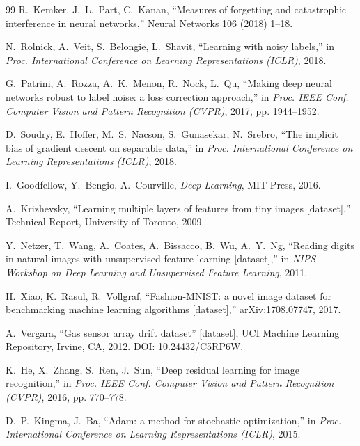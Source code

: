 \documentclass[review,12pt]{elsarticle}
\begin{document}
\begin{thebibliography}{99}
R.~Kemker, J.~L.~Part, C.~Kanan, ``Measures of forgetting and catastrophic
interference in neural networks,'' Neural Networks 106 (2018) 1--18.

N.~Rolnick, A.~Veit, S.~Belongie, L.~Shavit, ``Learning with noisy
labels,'' in \emph{Proc. International Conference on Learning Representations
(ICLR)}, 2018.

G.~Patrini, A.~Rozza, A.~K.~Menon, R.~Nock, L.~Qu,
``Making deep neural networks robust to label noise: a loss correction
approach,'' in \emph{Proc. IEEE Conf. Computer Vision and Pattern Recognition
(CVPR)}, 2017, pp. 1944--1952.

D.~Soudry, E.~Hoffer, M.~S.~Nacson, S.~Gunasekar, N.~Srebro,
``The implicit bias of gradient descent on separable data,''
in \emph{Proc. International Conference on Learning Representations (ICLR)},
2018.

I.~Goodfellow, Y.~Bengio, A.~Courville, \emph{Deep Learning}, MIT Press,
2016.

A.~Krizhevsky, ``Learning multiple layers of features from tiny images
[dataset],'' Technical Report, University of Toronto, 2009.

Y.~Netzer, T.~Wang, A.~Coates, A.~Bissacco, B.~Wu, A.~Y.~Ng,
``Reading digits in natural images with unsupervised feature learning
[dataset],''
in \emph{NIPS Workshop on Deep Learning and Unsupervised Feature Learning},
2011.

H.~Xiao, K.~Rasul, R.~Vollgraf, ``Fashion-MNIST: a novel image dataset for
benchmarking machine learning algorithms [dataset],'' arXiv:1708.07747, 2017.

A.~Vergara, ``Gas sensor array drift dataset'' [dataset], UCI Machine Learning
Repository, Irvine, CA, 2012. DOI: 10.24432/C5RP6W.

K.~He, X.~Zhang, S.~Ren, J.~Sun, ``Deep residual learning for image
recognition,'' in \emph{Proc. IEEE Conf. Computer Vision and Pattern
Recognition (CVPR)}, 2016, pp. 770--778.

D.~P.~Kingma, J.~Ba, ``Adam: a method for stochastic optimization,''
in \emph{Proc. International Conference on Learning Representations (ICLR)},
2015.


\end{thebibliography}
\end{document}
